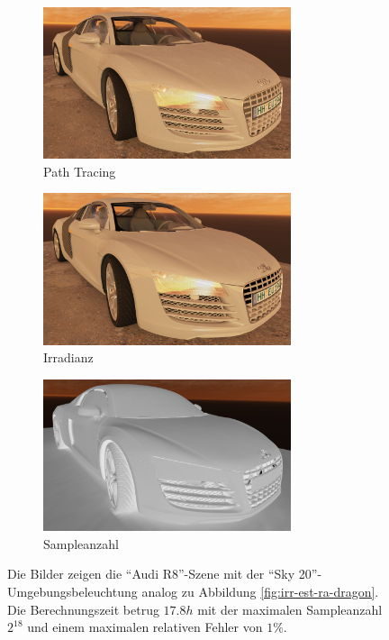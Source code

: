		\begin{figure}[h]
			\begin{subfigure}[t]{\textwidth}
				\center
				\includegraphics[width=0.8\textwidth]{pic/irr_est-ra-r8-ref.png}
				\caption{Path Tracing}
			\end{subfigure}
			\begin{subfigure}[t]{\textwidth}
				\center
				\includegraphics[width=0.8\textwidth]{pic/irr_est-ra-r8-irr.png}
				\caption{Irradianz}
			\end{subfigure}
			\begin{subfigure}[t]{\textwidth}
				\center
				\includegraphics[width=0.8\textwidth]{pic/irr_est-ra-r8-scount.png}
				\caption{Sampleanzahl}
			\end{subfigure}
			\caption[Adaptive Vertex-Irradiance-Map anhand der \enquote{Audi R8}-Szene]{Die Bilder zeigen die \enquote{Audi R8}-Szene mit der \enquote{Sky 20}-Umgebungsbeleuchtung analog zu Abbildung \ref{fig:irr-est-ra-dragon}. Die Berechnungszeit betrug $17.8\unit{h}$ mit der maximalen Sampleanzahl $2^{18}$ und einem maximalen relativen Fehler von $1\unit{\%}$.}
			\label{fig:irr-est-ra-audi}
		\end{figure}

